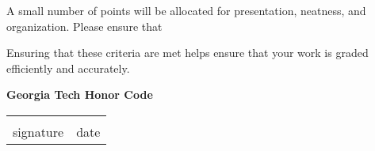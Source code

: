 \documentclass[12pt]{exam}
\begin{document}
\begin{questions}
\newpage



\question[1] A small number of points will be allocated for presentation, neatness, and organization. Please ensure that
    Ensuring that these criteria are met helps ensure that your work is graded efficiently and accurately. 

\end{questions}
\vspace{2cm}
    
    \vspace{6pt}
    \textbf{Georgia Tech Honor Code}\\
    \GTHonorCode
    
    \begin{center}
    \begin{center}
        \def\arraystretch{0.35}%
        \begin{tabular}{ b{8cm} b{8cm} }
        \vspace{.5cm} \underline{\hspace{7cm}} & \vspace{.5cm} \underline{\hspace{4.5cm}}  \tabularnewline
        \vspace{6pt} signature & \vspace{6pt} date    
        \end{tabular}
    \end{center}
    \end{center}    
\end{document}
